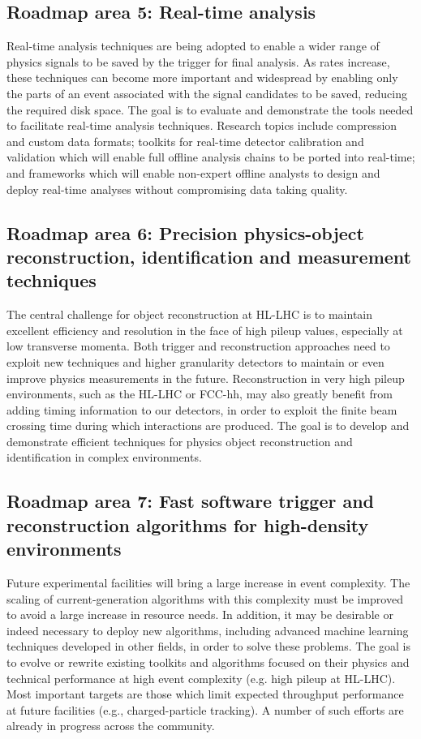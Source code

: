 \subsection*{Roadmap area 5: Real-time analysis }

Real-time analysis techniques are being adopted to enable a wider range of physics signals to be saved by the trigger for final analysis. As rates increase, these techniques can become more important and widespread by enabling only the parts of an event associated with the signal candidates to be saved, reducing the required disk space. The goal is to evaluate and demonstrate the tools needed to facilitate real-time analysis techniques. Research topics include compression and custom data formats; toolkits for real-time detector calibration and validation which will enable full offline analysis chains to be ported into real-time; and frameworks which will enable non-expert offline analysts to design and deploy real-time analyses without compromising data taking quality. 

\subsection*{Roadmap area 6: Precision physics-object reconstruction, identification and measurement techniques}

The central challenge for object reconstruction at HL-LHC is to maintain excellent efficiency and resolution in the face of high pileup values, especially at low transverse momenta. Both trigger and reconstruction approaches need to exploit new techniques and higher granularity detectors to maintain or even improve physics measurements in the future. Reconstruction in very high pileup environments, such as the HL-LHC or FCC-hh, may also greatly benefit from adding timing information to our detectors, in order to exploit the finite beam crossing time during which interactions are produced. The goal is to develop and demonstrate efficient techniques for physics object reconstruction and identification in complex environments.

\subsection*{Roadmap area 7: Fast software trigger and reconstruction algorithms for high-density environments }

Future experimental facilities will bring a large increase in event complexity. The scaling of current-generation algorithms with this complexity must be improved to avoid a large increase in resource needs. In addition, it may be desirable or indeed necessary to deploy new algorithms, including advanced machine learning techniques developed in other fields, in order to solve these problems. The goal is to evolve or rewrite existing toolkits and algorithms focused on their physics and technical performance at high event complexity (e.g. high pileup at HL-LHC). Most important targets are those which limit expected throughput performance at future facilities (e.g., charged-particle tracking). A number of such efforts are already in progress across the community.

